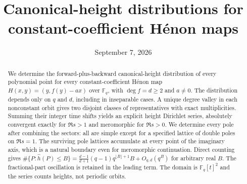 \documentclass[11pt]{article}
\title{Canonical-height distributions for constant-coefficient\texorpdfstring{ H\'enon}{ Henon} maps}
\author{}
\date{September 7, 2026}
\theoremstyle{remark}
\numberwithin{equation}{section}
\begin{document}
\maketitle
\begin{abstract}
We determine the forward-plus-backward canonical-height distribution
of every polynomial point for every constant-coefficient H\'enon map
$H(x,y)=(y,f(y)-a x)$ over $\mathbb F_q$, with $\deg f=d\ge2$ and
$a\ne0$. The distribution depends only on $q$ and $d$, including in
inseparable cases. A unique degree valley in each nonconstant orbit
gives two disjoint classes of representatives with exact multiplicities.
Summing their integer time shifts yields an explicit height Dirichlet
series, absolutely convergent exactly for $\Re s>1$ and meromorphic
for $\Re s>0$. We determine every pole after combining the sectors:
all are simple except for a specified lattice of double poles on
$\Re s=1$. The surviving pole lattices accumulate at every point
of the imaginary axis, which is a natural boundary even for meromorphic
continuation. Direct counting gives
$\#\{P:\widehat h(P)\le B\}=
\frac{d-1}{d+1}(q-1)q^{\lfloor B\rfloor+1}B+O_{q,d}(q^B)$
for arbitrary real $B$. The fractional-part oscillation is retained
in the leading term. The domain is $\mathbb F_q[t]^2$ and the
series counts heights, not periodic orbits.
\end{abstract}









\end{document}
